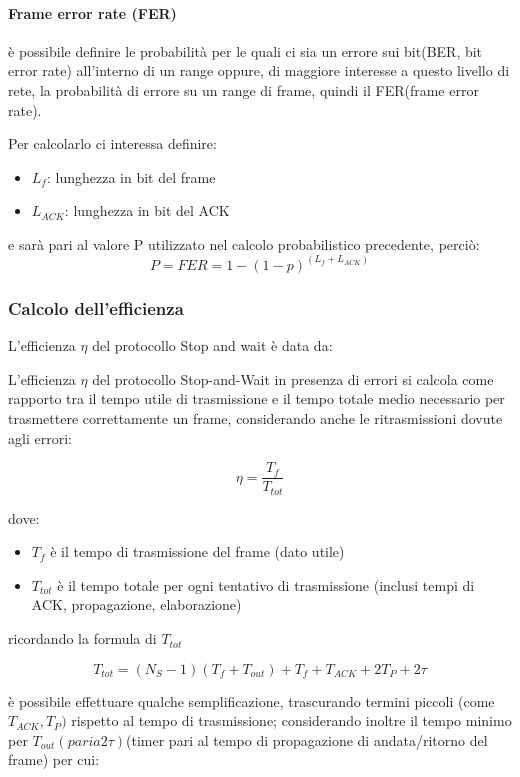 \paragraph{Frame error rate (FER)} è possibile definire le probabilità per le quali ci sia un errore sui bit(BER, bit error rate) all'interno di un range oppure, di maggiore interesse a questo livello di rete, la probabilità di errore su un range di frame, quindi il FER(frame error rate).

Per calcolarlo ci interessa definire:
\begin{itemize}
    \item $L_f$: lunghezza in bit del frame
    \item $L_{ACK}$: lunghezza in bit del ACK
\end{itemize}

e sarà pari al valore P utilizzato nel calcolo probabilistico precedente, perciò: 
\begin{equation}
P = FER = 1 - (1 - p)^{(L_f + L_{ACK})}
\end{equation}
\subsubsection{Calcolo dell'efficienza}
L'efficienza $\eta$ del protocollo Stop and wait è data da:

L'efficienza $\eta$ del protocollo Stop-and-Wait in presenza di errori si calcola come rapporto tra il tempo utile di trasmissione e il tempo totale medio necessario per trasmettere correttamente un frame, considerando anche le ritrasmissioni dovute agli errori:

\begin{equation}
\eta = \frac{T_f}{T_{tot}}
\end{equation}

dove:
\begin{itemize}
    \item $T_f$ è il tempo di trasmissione del frame (dato utile)
    \item $T_{tot}$ è il tempo totale per ogni tentativo di trasmissione (inclusi tempi di ACK, propagazione, elaborazione)
\end{itemize}

ricordando la formula di $T_{tot}$

\begin{equation}
T_{tot} = (N_S - 1)(T_f + T_{out}) + T_f + T_{ACK} + 2T_P + 2\tau
\end{equation}

è possibile effettuare qualche semplificazione, trascurando termini piccoli (come $T_{ACK}, T_P)$ rispetto al tempo di trasmissione; considerando inoltre il tempo minimo per $T_{out}(pari a 2\tau)$(timer pari al tempo di propagazione di andata/ritorno del frame) per cui:

